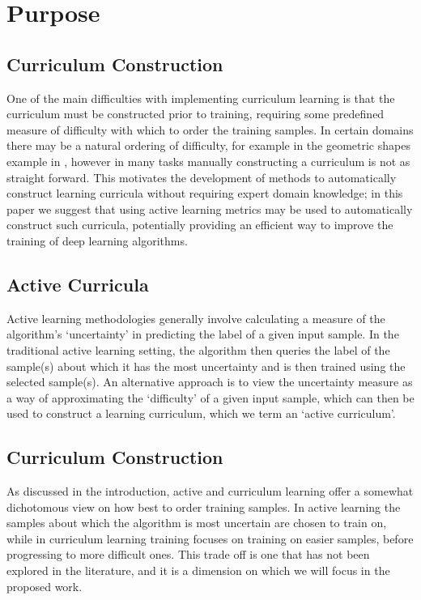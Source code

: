 \documentclass[a4paper,11pt]{article}
\begin{document}
\section{Purpose}
\subsection{Curriculum Construction}
One of the main difficulties with implementing curriculum learning is that the curriculum must be constructed prior to training, requiring some predefined measure of difficulty with which to order the training samples. In certain domains  there may be a natural ordering of difficulty, for example in the geometric shapes example in \cite{Bengio 09}, however in many tasks manually constructing a curriculum is not as straight forward. This motivates the development of methods to automatically construct learning curricula without requiring expert domain knowledge; in this paper we suggest that using active learning metrics may be used to automatically construct such curricula, potentially providing an efficient way to improve the training of deep learning algorithms.

\subsection{Active Curricula}
Active learning methodologies generally involve calculating a measure of the algorithm's `uncertainty' in predicting the label of a given input sample. In the traditional active learning setting, the algorithm then queries the label of the sample(s) about which it has the most uncertainty and is then trained using the selected sample(s). An alternative approach is to view the uncertainty measure as a way of approximating the `difficulty' of a given input sample, which can then be used to construct a learning curriculum, which we term an `active curriculum'.

\subsection{Curriculum Construction}
As discussed in the introduction, active and curriculum learning offer a somewhat dichotomous view on how best to order training samples. In active learning the samples about which the algorithm is most uncertain are chosen to train on, while in curriculum learning training focuses on training on easier samples, before progressing to more difficult ones. This trade off is one that has not been explored in the literature, and it is a dimension on which we will focus in the proposed work. 
\end{document}
